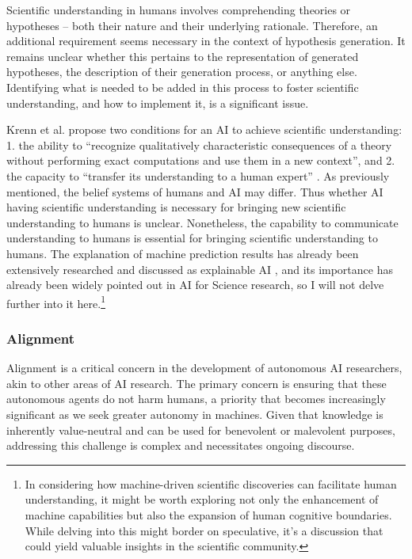 \documentclass{article}
\begin{document}
Scientific understanding in humans involves comprehending theories or hypotheses – both their nature and their underlying rationale. Therefore, an additional requirement seems necessary in the context of hypothesis generation. It remains unclear whether this pertains to the representation of generated hypotheses, the description of their generation process, or anything else. Identifying what is needed to be added in this process to foster scientific understanding, and how to implement it, is a significant issue.

Krenn et al. propose two conditions for an AI to achieve scientific understanding: 1. the ability to ``recognize qualitatively characteristic consequences of a theory without performing exact computations and use them in a new context'', and 2. the capacity to ``transfer its understanding to a human expert'' \cite{krenn2022scientific}.  As previously mentioned, the belief systems of humans and AI may differ. Thus whether AI having scientific understanding is necessary for bringing new scientific understanding to humans is unclear. Nonetheless, the capability to communicate understanding to humans is essential for bringing scientific understanding to humans. The explanation of machine prediction results has already been extensively researched and discussed as explainable AI \cite{arrieta2020explainable}, and its importance has already been widely pointed out in AI for Science research, so I will not delve further into it here.\footnote{
In considering how machine-driven scientific discoveries can facilitate human understanding, it might be worth exploring not only the enhancement of machine capabilities but also the expansion of human cognitive boundaries. While delving into this might border on speculative, it's a discussion that could yield valuable insights in the scientific community.
}

\subsubsection{Alignment}
Alignment is a critical concern in the development of autonomous AI researchers, akin to other areas of AI research. The primary concern is ensuring that these autonomous agents do not harm humans, a priority that becomes increasingly significant as we seek greater autonomy in machines. Given that knowledge is inherently value-neutral and can be used for benevolent or malevolent purposes, addressing this challenge is complex and necessitates ongoing discourse.
\end{document}
